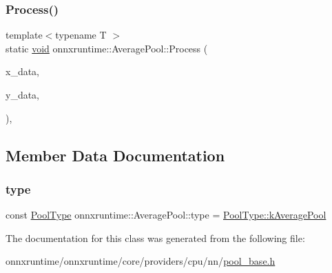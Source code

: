\subsubsection{\texorpdfstring{Process()}{Process()}}
{\footnotesize\ttfamily template$<$typename T $>$ \\
static \mbox{\hyperlink{mlasi_8h_a88f941d423cb2a819b70a1358982b1a6}{void}} onnxruntime\+::\+Average\+Pool\+::\+Process (\begin{DoxyParamCaption}\item[{const T \&}]{x\+\_\+data,  }\item[{T \&}]{y\+\_\+data,  }\item[{const \mbox{\hyperlink{classonnxruntime_1_1PoolProcessContext}{Pool\+Process\+Context}} \&}]{ }\end{DoxyParamCaption})\hspace{0.3cm}{\ttfamily [inline]}, {\ttfamily [static]}}



\subsection{Member Data Documentation}
\mbox{\label{classonnxruntime_1_1AveragePool_a48aefe1c9e248a55a958e87f06588089}} 
\subsubsection{\texorpdfstring{type}{type}}
{\footnotesize\ttfamily const \mbox{\hyperlink{namespaceonnxruntime_aa4ff52f19ea8c4d3e4ce3ffbabbc7060}{Pool\+Type}} onnxruntime\+::\+Average\+Pool\+::type = \mbox{\hyperlink{namespaceonnxruntime_aa4ff52f19ea8c4d3e4ce3ffbabbc7060a38dcd3a65185af31f965caa845edfb0f}{Pool\+Type\+::k\+Average\+Pool}}\hspace{0.3cm}{\ttfamily [static]}}



The documentation for this class was generated from the following file\+:\begin{DoxyCompactItemize}
\item 
onnxruntime/onnxruntime/core/providers/cpu/nn/\mbox{\hyperlink{pool__base_8h}{pool\+\_\+base.\+h}}\end{DoxyCompactItemize}
